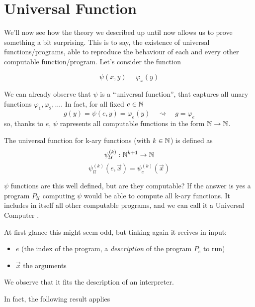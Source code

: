 \chapter {Universal Function}
\newcommand{\psiex}{\ensuremath{\psi_{\mathcal{U}}^{(k)} (e, \vec{x})}}
\newcommand{\psiuex}{\ensuremath{\psi_e^{(k)} (\vec{x})}}
We'll now see how the theory we described up until now allows us to
prove something a bit surprising. This is to say, the existence of
universal functions/programs, able to reproduce the behaviour of each
and every other computable function/program. Let's consider the function

\[
  \psi(x,y) = \varphi_x(y)
\]

We can already observe that $\psi$ is a ``universal function'', that
captures all unary functions $\varphi_1, \varphi_2, \dots$. In fact,
for all fixed $e \in \mathbb{N}$
\[
  g(y) = \psi(e,y) = \varphi_e(y) \quad \rightsquigarrow \quad g = \varphi_e
\]
so, thanks to $e$, $\psi$ rapresents all computable functions in the
form $\mathbb{N} \rightarrow \mathbb{N}$.

\begin{definition}
  The universal function for k-ary functions (with $k \in \mathbb{N}$) is
  defined as
  \[
    \psi_{\mathcal{U}}^{(k)} : \mathbb{N}^{k+1} \rightarrow \mathbb{N}
  \]
  \[
    \psiex = \psiuex
  \]
\end{definition}
$\psi$ functions are this well defined, but are they computable? If
the answer is yes a program $P_{\mathcal{U}}$ computing $\psi$ would
be able to compute all k-ary functions. It includes in itself all
other computable programs, and we can call it a Universal Computer
\cite{davis:2011}.

At first glance this might seem odd, but tinking again it recives in
input:
\begin{itemize}
\item $e$ (the index of the program, a \textit{description} of the
  program $P_e$ to run)
\item $\vec{x}$ the arguments
\end{itemize}
We observe that it fits the description of an interpreter.

In fact, the following result applies

